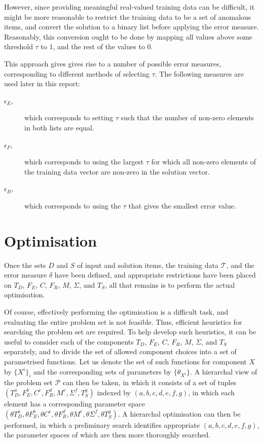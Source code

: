 However, since providing meaningful real-valued training data can be difficult, it might be more reasonable to restrict the training data to be a set of anomalous items, and convert the solution to a binary list before applying the error measure. Reasonably, this conversion ought to be done by mapping all values above some threshold $\tau$ to $1$, and the rest of the values to $0$.

This approach gives gives rise to a number of possible error measures, corresponding to different methods of selecting $\tau$. The following measures are used later in this report:
\begin{description}
    \item[$\epsilon_{E}$,]which corresponds to setting $\tau$ such that the number of non-zero elements in both lists are equal.
    \item[$\epsilon_{F}$,]which corresponds to using the largest $\tau$ for which all non-zero elements of the training data vector are non-zero in the solution vector.
    \item[$\epsilon_{B}$,]which corresponds to using the $\tau$ that gives the smallest error value.
\end{description}

\section{Optimisation}

Once the sets $D$ and $S$ of input and solution items, the training data $\mathcal{T}$, and the error measure $\delta$ have been defined, and appropriate restrictions have been placed on $T_D$, $F_E$, $C$, $F_R$, $M$, $\Sigma$, and $T_S$, all that remains is to perform the actual optimisation.

Of course, effectively performing the optimisation is a difficult task, and evaluating the entire problem set is not feasible. Thus, efficient heuristics for searching the problem set are required. To help develop such heuristics, it can be useful to consider each of the components $T_D$, $F_E$, $C$, $F_R$, $M$, $\Sigma$, and $T_S$ separately, and to divide the set of allowed component choices into a set of parametrised functions. Let us denote the set of such functions for component $X$ by $\{X^i\}_i$ and the corresponding sets of parameters by $\{\theta_{X^i}\}$. A hierarchal view of the problem set $\mathcal{P}$ can then be taken, in which it consists of a set of tuples $(T_D^a, F_E^b, C^c, F_R^d, M^e, \Sigma^f, T_S^g)$ indexed by $(a, b, c, d, e, f, g)$, in which each element has a corresponding parameter space $(\theta{T_D^a}, \theta{F_E^b}, \theta{C^c}, \theta{F_R^d}, \theta{M^e}, \theta{\Sigma^f}, \theta{T_S^g})$. A hierarchal optimisation can then be performed, in which a preliminary search identifies appropriate $(a, b, c, d, e, f, g)$, the parameter spaces of which are then more thoroughly searched.

